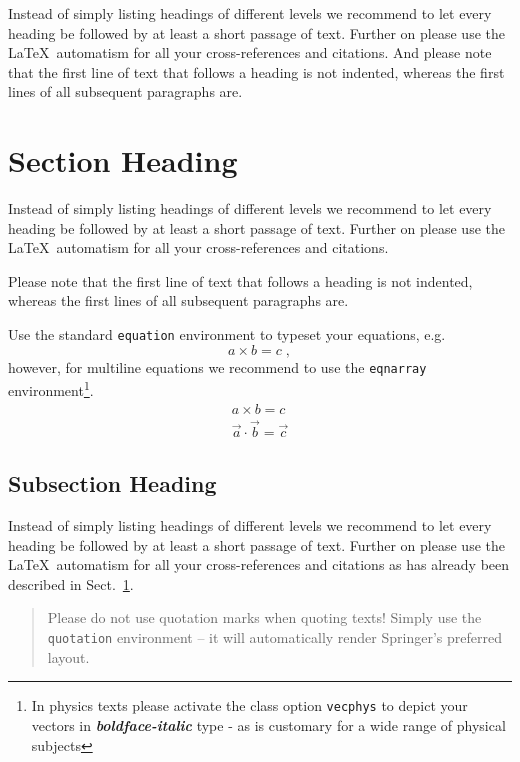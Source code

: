 \documentclass[graybox]{svmult}
\begin{document}
Instead of simply listing headings of different levels we recommend to
let every heading be followed by at least a short passage of text.
Further on please use the \LaTeX\ automatism for all your
cross-references and citations. And please note that the first line of
text that follows a heading is not indented, whereas the first lines of
all subsequent paragraphs are.

\section{Section Heading}
\label{sec:2}
Instead of simply listing headings of different levels we recommend to
let every heading be followed by at least a short passage of text.
Further on please use the \LaTeX\ automatism for all your
cross-references and citations.

Please note that the first line of text that follows a heading is not indented, whereas the first lines of all subsequent paragraphs are.

Use the standard \verb|equation| environment to typeset your equations, e.g.
%
\begin{equation}
a \times b = c\;,
\end{equation}
%
however, for multiline equations we recommend to use the \verb|eqnarray| environment\footnote{In physics texts please activate the class option \texttt{vecphys} to depict your vectors in \textbf{\itshape boldface-italic} type - as is customary for a wide range of physical subjects}.
\begin{eqnarray}
a \times b = c \nonumber\\
\vec{a} \cdot \vec{b}=\vec{c}
\label{eq:01}
\end{eqnarray}

\subsection{Subsection Heading}
\label{subsec:2}
Instead of simply listing headings of different levels we recommend to
let every heading be followed by at least a short passage of text.
Further on please use the \LaTeX\ automatism for all your
cross-references and citations
as has already been described in Sect.~\ref{sec:2}.

\begin{quotation}
Please do not use quotation marks when quoting texts! Simply use the \verb|quotation| environment -- it will automatically render Springer's preferred layout.
\end{quotation}
\end{document}
